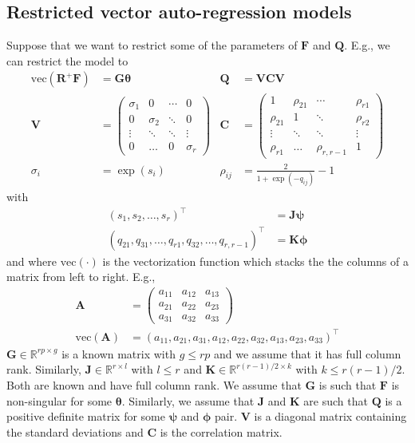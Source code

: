 \documentclass[notitlepage]{article}
\renewcommand{\vec}[1]{\bm{#1}}
\newcommand{\mat}[1]{\mathbf{#1}}
\newcommand{\Lparen}[1]{\left( #1\right)}
\newcommand{\optor}[2]{#1\Lparen{#2}}
\newcommand{\vecOP}[1]{\optor{\text{vec}}{#1}}
\newcommand{\dimState}{p}
\newcommand{\dimRng}{r}
\begin{document}
\subsection{Restricted vector auto-regression models}
Suppose that we want to restrict some of the parameters of $\mat{F}$ and $\mat{Q}$. E.g., we can restrict the model to %
%
\begin{align*}
\vecOP{\mat{R}^+\mat{F}} &= \mat{G}\vec{\theta} &  
  \mat{Q} &= \mat{V}\mat{C}\mat{V} \\
\mat{V} &= \begin{pmatrix} 
     \sigma_1 & 0 & \cdots & 0 \\
     0 & \sigma_2 & \ddots & 0 \\
     \vdots & \ddots & \ddots & \vdots \\
     0 & \dots & 0 & \sigma_\dimRng
   \end{pmatrix} &
  \mat{C} &= \begin{pmatrix} 
     1 & \rho_{21} & \cdots & \rho_{\dimRng1} \\
     \rho_{21} & 1 & \ddots & \rho_{\dimRng2} \\
     \vdots & \ddots & \ddots & \vdots \\
     \rho_{\dimRng1} & \dots & \rho_{\dimRng,\dimRng-1} & 1
   \end{pmatrix} \\
\sigma_i &= \exp(s_i) & 
  \rho_{ij}&= \frac{2}{1 + \exp(-q_{ij})} - 1
\end{align*}%
%
with%
%
\begin{align*}
  (s_1,s_2,\dots, s_\dimRng)^\top&=\mat{J}\vec\psi \\
  (q_{21},q_{31},\dots,q_{\dimRng1},q_{32},\dots,q_{\dimRng,\dimRng-1})^\top&=\mat{K}\vec\phi  
\end{align*} %
%
and where $\vecOP{\cdot}$ is the vectorization function which stacks the the columns of a matrix from left to right. E.g., %
%
\begin{align*}
\mat{A} &= \begin{pmatrix}
	a_{11} & a_{12} & a_{13} \\
	a_{21} & a_{22} & a_{23} \\
	a_{31} & a_{32} & a_{33}
\end{pmatrix} \\
\vecOP{\mat{A}} &= \Lparen{
	a_{11}, a_{21}, a_{31}, 
	a_{12}, a_{22}, a_{32},
	a_{13}, a_{23}, a_{33}}^\top
\end{align*}
%
$\mat{G}\in\mathbb{R}^{\dimRng\dimState \times g}$ is a known matrix with $g \leq \dimRng\dimState$ and we assume that it has full column rank. Similarly, $\mat{J}\in\mathbb{R}^{\dimRng \times l}$ with $l \leq \dimRng$ and $\mat{K}\in\mathbb{R}^{\dimRng(\dimRng - 1)/2 \times k}$ with $k\leq \dimRng(\dimRng - 1)/2$. Both are known and have full column rank. We assume that $\mat{G}$ is such that $\mat{F}$ is non-singular for some $\vec{\theta}$. Similarly, we assume that $\mat{J}$ and $\mat{K}$ are such that $\mat{Q}$ is a positive definite matrix for some $\vec{\psi}$ and $\vec{\phi}$ pair. $\mat{V}$ is a diagonal matrix containing the standard deviations and $\mat{C}$ is the correlation matrix.
\end{document}
